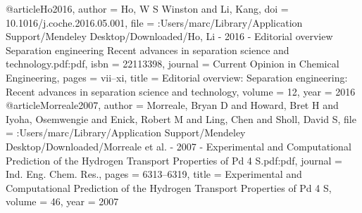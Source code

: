 @article{Ho2016,
author = {Ho, W S Winston and Li, Kang},
doi = {10.1016/j.coche.2016.05.001},
file = {:Users/marc/Library/Application Support/Mendeley Desktop/Downloaded/Ho, Li - 2016 - Editorial overview Separation engineering Recent advances in separation science and technology.pdf:pdf},
isbn = {22113398},
journal = {Current Opinion in Chemical Engineering},
pages = {vii--xi},
title = {{Editorial overview: Separation engineering: Recent advances in separation science and technology}},
volume = {12},
year = {2016}
}
@article{Morreale2007,
author = {Morreale, Bryan D and Howard, Bret H and Iyoha, Osemwengie and Enick, Robert M and Ling, Chen and Sholl, David S},
file = {:Users/marc/Library/Application Support/Mendeley Desktop/Downloaded/Morreale et al. - 2007 - Experimental and Computational Prediction of the Hydrogen Transport Properties of Pd 4 S.pdf:pdf},
journal = {Ind. Eng. Chem. Res.},
pages = {6313--6319},
title = {{Experimental and Computational Prediction of the Hydrogen Transport Properties of Pd 4 S}},
volume = {46},
year = {2007}
}
